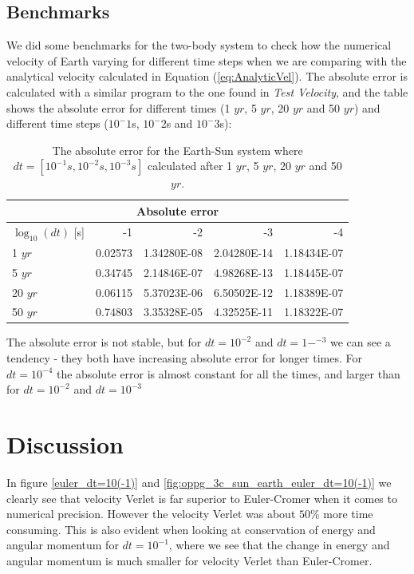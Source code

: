 \documentclass[norsk,a4paper,12pt]{article}
\begin{document}
{\subsection{Benchmarks}
We did some benchmarks for the two-body system to check how the numerical velocity of Earth varying for different time steps when we are comparing with the analytical velocity calculated in Equation (\ref{eq:AnalyticVel}). The absolute error is calculated with a similar program to the one found in \textit{Test Velocity}, and the table shows the absolute error for different times (1 $yr$, 5 $yr$, 20 $yr$ and 50 $yr$) and different time steps ($10^-1$s, $10^-2$s and $10^-3$s):
\begin{table}[H]
\centering
\caption{The absolute error for the Earth-Sun system where $dt=[10^{-1}s,10^{-2}s,10^{-3}s]$ calculated after 1 $yr$, 5 $yr$, 20 $yr$ and 50 $yr$.}
\label{tab:Benchmark}
\begin{tabular}{lrrrr}
\hline
\multicolumn{5}{c}{Absolute error}\\
\hline
$\log_{10}(dt)$ [s]        & -1 & -2 & -3 & -4 \\
\hline
1 $yr$      & 0.02573  & 1.34280E-08  & 2.04280E-14 & 1.18434E-07 \\
5 $yr$      & 0.34745  & 2.14846E-07  & 4.98268E-13 & 1.18445E-07 \\
20 $yr$     & 0.06115  & 5.37023E-06  & 6.50502E-12 & 1.18389E-07 \\
50 $yr$     & 0.74803  & 3.35328E-05  & 4.32525E-11 & 1.18322E-07 \\
\hline
\end{tabular}
\end{table}
The absolute error is not stable, but for $dt=10^{-2}$ and $dt=1-^{-3}$ we can see a tendency - they both have increasing absolute error for longer times. For $dt=10^{-4}$ the absolute error is almost constant for all the times, and larger than for $dt=10^{-2}$ and $dt=10^{-3}$
\section{Discussion}
In figure \ref{euler_dt=10(-1)} and \ref{fig:oppg_3c_sun_earth_euler_dt=10(-1)} we clearly see that velocity Verlet is far superior to Euler-Cromer when it comes to numerical precision. However the velocity Verlet was about $50\%$ more time consuming. This is also evident when looking at conservation of energy and angular momentum for $dt = 10^{-1}$, where we see that the change in energy and angular momentum is much smaller for velocity Verlet than Euler-Cromer.

}
\end{document}
